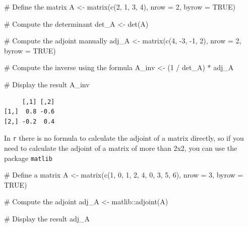 \documentclass[
  letterpaper,
  DIV=11,
  numbers=noendperiod]{scrartcl}
\newenvironment{Shaded}{\begin{snugshade}}{\end{snugshade}}
\newcommand{\AttributeTok}[1]{\textcolor[rgb]{0.40,0.45,0.13}{#1}}
\newcommand{\CommentTok}[1]{\textcolor[rgb]{0.37,0.37,0.37}{#1}}
\newcommand{\ConstantTok}[1]{\textcolor[rgb]{0.56,0.35,0.01}{#1}}
\newcommand{\DecValTok}[1]{\textcolor[rgb]{0.68,0.00,0.00}{#1}}
\newcommand{\FunctionTok}[1]{\textcolor[rgb]{0.28,0.35,0.67}{#1}}
\newcommand{\NormalTok}[1]{\textcolor[rgb]{0.00,0.23,0.31}{#1}}
\newcommand{\OtherTok}[1]{\textcolor[rgb]{0.00,0.23,0.31}{#1}}
\newcommand{\SpecialCharTok}[1]{\textcolor[rgb]{0.37,0.37,0.37}{#1}}
\begin{document}
\begin{Shaded}
\begin{Highlighting}[]
\CommentTok{\# Define the matrix}
\NormalTok{A }\OtherTok{\textless{}{-}} \FunctionTok{matrix}\NormalTok{(}\FunctionTok{c}\NormalTok{(}\DecValTok{2}\NormalTok{, }\DecValTok{1}\NormalTok{, }\DecValTok{3}\NormalTok{, }\DecValTok{4}\NormalTok{), }\AttributeTok{nrow =} \DecValTok{2}\NormalTok{, }\AttributeTok{byrow =} \ConstantTok{TRUE}\NormalTok{)}

\CommentTok{\# Compute the determinant}
\NormalTok{det\_A }\OtherTok{\textless{}{-}} \FunctionTok{det}\NormalTok{(A)}

\CommentTok{\# Compute the adjoint manually}
\NormalTok{adj\_A }\OtherTok{\textless{}{-}} \FunctionTok{matrix}\NormalTok{(}\FunctionTok{c}\NormalTok{(}\DecValTok{4}\NormalTok{, }\SpecialCharTok{{-}}\DecValTok{3}\NormalTok{, }\SpecialCharTok{{-}}\DecValTok{1}\NormalTok{, }\DecValTok{2}\NormalTok{), }\AttributeTok{nrow =} \DecValTok{2}\NormalTok{, }\AttributeTok{byrow =} \ConstantTok{TRUE}\NormalTok{)}

\CommentTok{\# Compute the inverse using the formula}
\NormalTok{A\_inv }\OtherTok{\textless{}{-}}\NormalTok{ (}\DecValTok{1} \SpecialCharTok{/}\NormalTok{ det\_A) }\SpecialCharTok{*}\NormalTok{ adj\_A}

\CommentTok{\# Display the result}
\NormalTok{A\_inv}
\end{Highlighting}
\end{Shaded}

\begin{verbatim}
     [,1] [,2]
[1,]  0.8 -0.6
[2,] -0.2  0.4
\end{verbatim}

In \texttt{r} there is no formula to calculate the adjoint of a matrix
directly, so if you need to calculate the adjoint of a matrix of more
than 2x2, you can use the package \texttt{matlib}

\begin{Shaded}
\begin{Highlighting}[]
\CommentTok{\# Define a matrix}
\NormalTok{A }\OtherTok{\textless{}{-}} \FunctionTok{matrix}\NormalTok{(}\FunctionTok{c}\NormalTok{(}\DecValTok{1}\NormalTok{, }\DecValTok{0}\NormalTok{, }\DecValTok{1}\NormalTok{, }\DecValTok{2}\NormalTok{, }\DecValTok{4}\NormalTok{, }\DecValTok{0}\NormalTok{, }\DecValTok{3}\NormalTok{, }\DecValTok{5}\NormalTok{, }\DecValTok{6}\NormalTok{), }\AttributeTok{nrow =} \DecValTok{3}\NormalTok{, }\AttributeTok{byrow =} \ConstantTok{TRUE}\NormalTok{)}

\CommentTok{\# Compute the adjoint}
\NormalTok{adj\_A }\OtherTok{\textless{}{-}}\NormalTok{ matlib}\SpecialCharTok{::}\FunctionTok{adjoint}\NormalTok{(A)}

\CommentTok{\# Display the result}
\NormalTok{adj\_A}
\end{Highlighting}
\end{Shaded}
\end{document}
